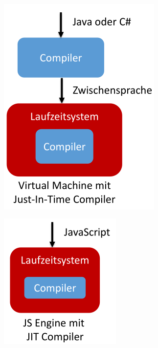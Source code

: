 \documentclass[11pt,twoside,landscape]{article}
\begin{document}
\begin{multicols}{3}
{
\begin{center}
\includegraphics[width=.9\linewidth]{img/java_csharp_architecture.png}
\end{center}
\label{fig:java-csharp-architecture}
}

{
\begin{center}
\includegraphics[width=.9\linewidth]{img/js_architecture.png}
\end{center}
\label{fig:js-architecture}
}


\end{multicols}
\end{document}

